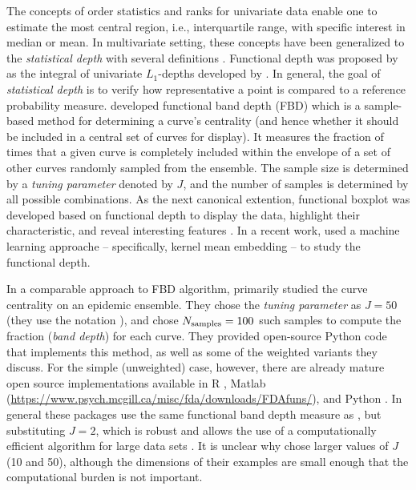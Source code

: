 \documentclass[fleqn,10pt,lineno]{wlpeerj}
\begin{document}
The concepts of order statistics and ranks for univariate data enable one to estimate the most central region, i.e., interquartile range, with specific interest in median or mean. In multivariate setting, these concepts have been generalized to the \emph{statistical depth} with several definitions \citep{mahalanobis1936generalized, tukey1975mathematics, oja1983descriptive, liu1990notion, singh1991notion, vardi2000multivariate, zuo2003projection}. Functional depth was proposed by \cite{fraiman2001trimmed} as the integral of univariate $L_1$-depths developed by \cite{vardi2000multivariate}. In general, the goal of \emph{statistical depth} is to verify how representative a point is compared to a reference probability measure. \cite{lopez2007depth} developed functional band depth (FBD) which is a sample-based method for determining a curve's centrality (and hence whether it should be included in a central set of curves for display). It measures the fraction of times that a given curve is completely included within the envelope of a set of other curves randomly sampled from the ensemble. The sample size is determined by a \emph{tuning parameter} denoted by $J$, and the number of samples is determined by all possible combinations. As the next canonical extention, functional boxplot was developed based on functional depth to display the data, highlight their characteristic, and reveal interesting features \citep{sun2011functional,sun2012exact}. In a recent work, \cite{wynne2021statistical} used a machine learning approache -- specifically, kernel mean embedding -- to study the functional depth.

In a comparable approach to FBD algorithm, \juul primarily studied the curve centrality on an epidemic ensemble. They chose the \emph{tuning parameter} as $J=50$ (they use the notation \ncurve), and chose $N_{\textrm{samples}}=100$ such samples to compute the fraction (\emph{band depth}) for each curve. They provided open-source Python code that implements this method, as well as some of the weighted variants they discuss. For the simple (unweighted) case, however, there are already mature open source implementations available in R \citep{fda_pkg,roahd}, Matlab (\url{https://www.psych.mcgill.ca/misc/fda/downloads/FDAfuns/}), and Python \citep{seabold2010statsmodels}. In general these packages use the same functional band depth measure as \juul, but substituting $J=2$, which is robust \citep{lopez2009concept} and allows the use of a computationally efficient algorithm for large data sets \citep{sun2012exact}. It is unclear why \juul chose larger values of $J$ (10 and 50), although the dimensions of their examples are small enough that the computational burden is not important.
\end{document}
